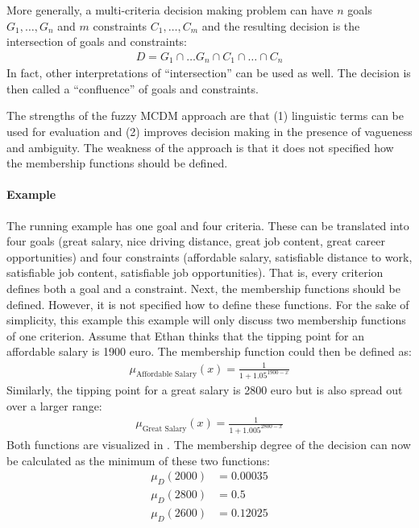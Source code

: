 More generally, a multi-criteria decision making problem can have $n$ goals $G_1, \ldots, G_n$ and $m$ constraints $C_1, \ldots, C_m$ and the resulting decision is the intersection of goals and constraints:
\begin{gather*}
    D = G_1 \cap \ldots G_n \cap C_1 \cap \ldots \cap C_n
\end{gather*}
In fact, other interpretations of ``intersection'' can be used as well. The decision is then called a ``confluence'' of goals and constraints.

The strengths of the fuzzy MCDM approach are that (1) linguistic terms can be used for evaluation and (2) improves decision making in the presence of vagueness and ambiguity. The weakness of the approach is that it does not specified how the membership functions should be defined.

\paragraph{Example} The running example has one goal and four criteria. These can be translated into four goals (great salary, nice driving distance, great job content, great career opportunities) and four constraints (affordable salary, satisfiable distance to work, satisfiable job content, satisfiable job opportunities). That is, every criterion defines both a goal and a constraint. Next, the membership functions should be defined. However, it is not specified how to define these functions. For the sake of simplicity, this example this example will only discuss two membership functions of one criterion. Assume that Ethan thinks that the tipping point for an affordable salary is 1900 euro. The membership function could then be defined as:
\begin{gather*}
    \mu_{\text{Affordable Salary}}\left(x\right) = \frac{1}{1 + 1.05^{1900 - x}}
\end{gather*}
Similarly, the tipping point for a great salary is 2800 euro but is also spread out over a larger range:
\begin{gather*}
    \mu_{\text{Great Salary}}\left(x\right) = \frac{1}{1 + 1.005^{2800 - x}}
\end{gather*}
Both functions are visualized in . The membership degree of the decision can now be calculated as the minimum of these two functions:
\begin{align*}
    \mu_{D}\left(2000\right) & = 0.00035 \\
    \mu_{D}\left(2800\right) & = 0.5     \\
    \mu_{D}\left(2600\right) & = 0.12025 
\end{align*}

